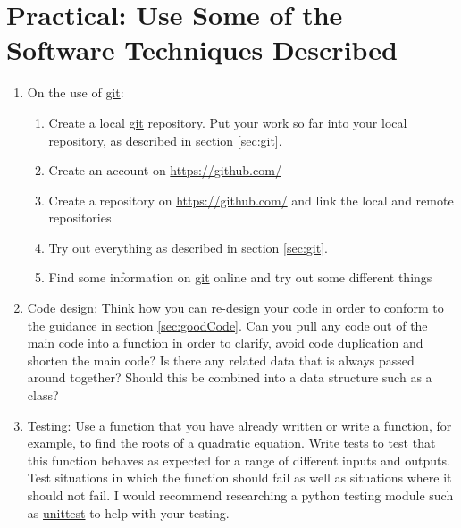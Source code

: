 \clearpage{}

\section{Practical: Use Some of the Software Techniques Described}
\begin{enumerate}
\item On the use of \url{git}:

\begin{enumerate}
\item Create a local \url{git} repository. Put your work so far into your
local repository, as described in section \ref{sec:git}.
\item Create an account on \url{https://github.com/} 
\item Create a repository on \url{https://github.com/} and link the local
and remote repositories
\item Try out everything as described in section \ref{sec:git}.
\item Find some information on \url{git} online and try out some different
things
\end{enumerate}
\item Code design: Think how you can re-design your code in order to conform
to the guidance in section \ref{sec:goodCode}. Can you pull any code
out of the main code into a function in order to clarify, avoid code
duplication and shorten the main code? Is there any related data that
is always passed around together? Should this be combined into a data
structure such as a class?
\item Testing: Use a function that you have already written or write a function,
for example, to find the roots of a quadratic equation. Write tests
to test that this function behaves as expected for a range of different
inputs and outputs. Test situations in which the function should fail
as well as situations where it should not fail. I would recommend
researching a python testing module such as \url{unittest} to help
with your testing.
\end{enumerate}


